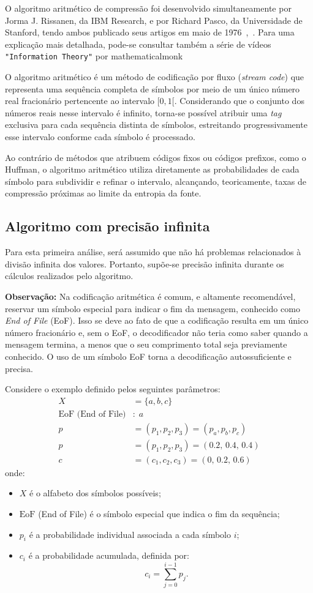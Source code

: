 O algoritmo aritmético de compressão foi desenvolvido simultaneamente por Jorma J. Rissanen, da IBM Research, e por Richard Pasco, da Universidade de Stanford, tendo ambos publicado seus artigos em maio de 1976~\cite{10.5555/908099},~\cite{5391119}. Para uma explicação mais detalhada, pode-se consultar também a série de vídeos \texttt{"Information Theory"} por mathematicalmonk

O algoritmo aritmético é um método de codificação por fluxo (\textit{stream code}) que representa uma sequência completa de símbolos por meio de um único número real fracionário pertencente ao intervalo $[0,1[$. Considerando que o conjunto dos números reais nesse intervalo é infinito, torna-se possível atribuir uma \textit{tag} exclusiva para cada sequência distinta de símbolos, estreitando progressivamente esse intervalo conforme cada símbolo é processado.

Ao contrário de métodos que atribuem códigos fixos ou códigos prefixos, como o Huffman, o algoritmo aritmético utiliza diretamente as probabilidades de cada símbolo para subdividir e refinar o intervalo, alcançando, teoricamente, taxas de compressão próximas ao limite da entropia da fonte.

\subsection{Algoritmo com precisão infinita}

Para esta primeira análise, será assumido que não há problemas relacionados à divisão infinita dos valores. Portanto, supõe-se precisão infinita durante os cálculos realizados pelo algoritmo.

\textbf{Observação:} Na codificação aritmética é comum, e altamente recomendável, reservar um símbolo especial para indicar o fim da mensagem, conhecido como \textit{End of File} (EoF). Isso se deve ao fato de que a codificação resulta em um único número fracionário e, sem o EoF, o decodificador não teria como saber quando a mensagem termina, a menos que o seu comprimento total seja previamente conhecido. O uso de um símbolo EoF torna a decodificação autossuficiente e precisa.


Considere o exemplo definido pelos seguintes parâmetros:
\[
\begin{aligned}
X &= \{a, b, c\} \\
\text{EoF (End of File)} &:\; a \\
p &= (p_1, p_2, p_3) = (p_a, p_b, p_c) \\
p &= (p_1, p_2, p_3) = (0.2,\, 0.4,\, 0.4) \\
c &= (c_1, c_2, c_3) = (0,\, 0.2,\, 0.6)
\end{aligned}
\]
onde:
\begin{itemize}
  \item $X$ é o alfabeto dos símbolos possíveis;
  \item $\text{EoF}$ (End of File) é o símbolo especial que indica o fim da sequência;
  \item $p_i$ é a probabilidade individual associada a cada símbolo $i$;
  \item $c_i$ é a probabilidade acumulada, definida por:
\[
c_i = \sum_{j=0}^{i-1} p_j.
\]
\end{itemize}

